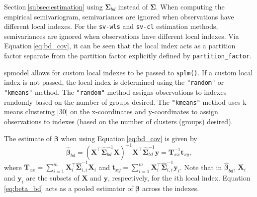 \documentclass[10pt,letterpaper]{article}
\begin{document}
Section\(~\)\ref{subsec:estimation} using \(\boldsymbol{\Sigma}_{bd}\)
instead of \(\boldsymbol{\Sigma}\). When computing the empirical
semivariogram, semivariances are ignored when observations have
different local indexes. For the \texttt{sv-wls} and \texttt{sv-cl}
estimation methods, semivariances are ignored when observations have
different local indexes. Via Equation\(~\)\ref{eq:bd_cov}, it can be
seen that the local index acts as a partition factor separate from the
partition factor explicitly defined by \texttt{partition\_factor}.

spmodel allows for custom local indexes to be passed to \texttt{splm()}.
If a custom local index is not passed, the local index is determined
using the \texttt{"random"} or \texttt{"kmeans"} method. The
\texttt{"random"} method assigns observations to indexes randomly based
on the number of groups desired. The \texttt{"kmeans"} method uses
k-means clustering {[}30{]} on the x-coordinates and y-coordinates to
assign observations to indexes (based on the number of clusters (groups)
desired).

The estimate of \(\boldsymbol{\beta}\) when using
Equation\(~\)\ref{eq:bd_cov} is given by
\begin{equation}\label{eq:beta_bd}
  \hat{\boldsymbol{\beta}}_{bd} = (\mathbf{X}^\top \boldsymbol{\hat{\Sigma}}^{-1}_{bd}\mathbf{X})^{-1}\mathbf{X}^\top \boldsymbol{\hat{\Sigma}}^{-1}_{bd} \mathbf{y} = \mathbf{T}^{-1}_{xx}\mathbf{t}_{xy},
\end{equation} where
\(\mathbf{T}_{xx} = \sum_{i = 1}^m \mathbf{X}_i^\top \boldsymbol{\hat{\Sigma}}^{-1}_{i, i}\mathbf{X}_i\)
and
\(\mathbf{t}_{xy} = \sum_{i = 1}^m \mathbf{X}_i^\top \hat{\boldsymbol{\Sigma}}^{-1}_{i, i} \mathbf{y}_i\).
Note that in \(\hat{\boldsymbol{\beta}}_{bd}\), \(\mathbf{X}_i\) and
\(\mathbf{y}_i\) are the subsets of \(\mathbf{X}\) and \(\mathbf{y}\),
respectively, for the \(i\)th local index. Equation\(~\)\ref{eq:beta_bd}
acts as a pooled estimator of \(\boldsymbol{\beta}\) across the indexes.
\end{document}
